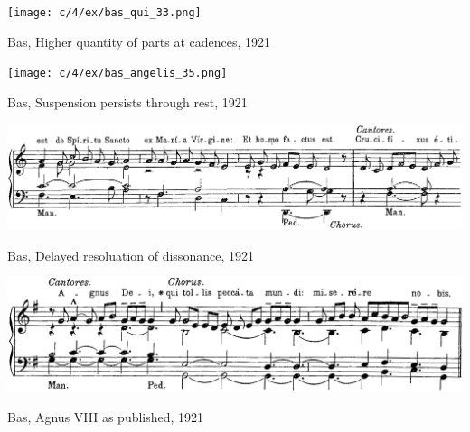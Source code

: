 \vspace*{\fill}

\begin{example}
  \centering
  \texttt{[image: c/4/ex/bas\_qui\_33.png]}
  \caption{Bas, Higher quantity of parts at cadences, 1921}
  \label{mus:bas_qui_33}
\end{example}

\vspace*{\fill}

\newpage

\vspace*{\fill}

\begin{example}
  \centering
  \texttt{[image: c/4/ex/bas\_angelis\_35.png]}
  \caption{Bas, Suspension persists through rest, 1921}
  \label{mus:bas_angelis_35}
\end{example}

\vspace*{\fill}

\begin{example}
  \centering
  \includegraphics[width=\linewidth]{c/4/ex/bas_ethomo_78.png}
  \caption{Bas, Delayed resoluation of dissonance, 1921}
  \label{mus:bas_ethomo}
\end{example}

\vspace*{\fill}

\newpage

\vspace*{\fill}

\begin{example}
  \centering
  \includegraphics[width=\linewidth]{c/4/ex/bas_sustainedstyle_kyriale.png}
  \caption{Bas, Agnus VIII as published, 1921}
  \label{mus:bas_sustained_kyriale}
\end{example}

